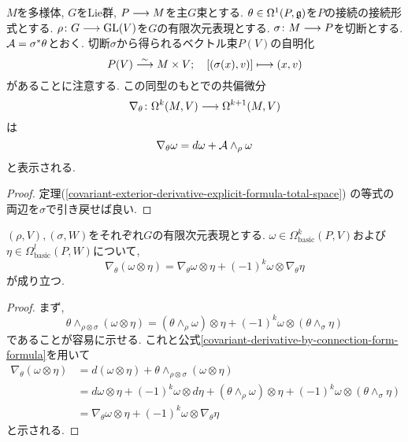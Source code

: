 \begin{thm}
\label{covariant-derivative-by-connection-form-formula}
$M$を多様体, $G$をLie群, $P \longrightarrow M$を主$G$束とする.
$\theta \in \Omega^1(P, \mathfrak{g})$を$P$の接続の接続形式とする.
$\rho \colon G \longrightarrow \operatorname{GL}(V)$を$G$の有限次元表現とする.
$\sigma \colon M \longrightarrow P$を切断とする.
$\mathcal{A} = \sigma^*\theta$とおく.
切断$\sigma$から得られるベクトル束$P(V)$の自明化
\begin{equation}
P(V) \stackrel{\sim}{\longrightarrow} M \times V; \quad [(\sigma(x), v)] \longmapsto (x, v)
\end{equation}
があることに注意する.
この同型のもとでの共偏微分
\begin{equation}
\nabla_\theta \colon \Omega^k(M, V) \longrightarrow \Omega^{k+1}(M, V)
\end{equation}
は
\begin{equation}
\nabla_\theta \omega = d\omega + \mathcal{A} \wedge_\rho \omega
\end{equation}
と表示される.
\end{thm}

\begin{proof}
定理(\ref{covariant-exterior-derivative-explicit-formula-total-space})
の等式の両辺を$\sigma$で引き戻せば良い.
\end{proof}

\begin{thm}
  \label{covariant-derivative-Leibnitz-rule}
  $(\rho, V), (\sigma,W)$をそれぞれ$G$の有限次元表現とする.
  $\omega \in \Omega^k_\mathrm{basic}(P,V)$および
  $\eta \in \Omega^l_\mathrm{basic}(P,W)$について,
  \begin{equation}
    \nabla_\theta (\omega \otimes \eta) =
    \nabla_\theta \omega \otimes \eta +
    (-1)^k \omega \otimes \nabla_\theta \eta
  \end{equation}
  が成り立つ.
\end{thm}

\begin{proof}
  まず,
  \begin{equation}
    \theta\wedge_{\rho\otimes\sigma}(\omega\otimes\eta)=(\theta\wedge_\rho\omega)\otimes\eta +
    (-1)^k\omega\otimes(\theta\wedge_\sigma\eta)
  \end{equation}
  であることが容易に示せる.
  これと公式\ref{covariant-derivative-by-connection-form-formula}を用いて
  \begin{align*}
    \nabla_\theta (\omega \otimes \eta) &=
    d(\omega \otimes \eta) +
    \theta\wedge_{\rho\otimes\sigma}(\omega\otimes\eta) \\&=
    d\omega\otimes\eta + (-1)^k\omega\otimes d\eta +
    (\theta\wedge_\rho\omega)\otimes\eta +
    (-1)^k\omega\otimes(\theta\wedge_\sigma\eta) \\&=
    \nabla_\theta \omega \otimes \eta +
    (-1)^k \omega \otimes \nabla_\theta \eta
  \end{align*}
  と示される.
\end{proof}

